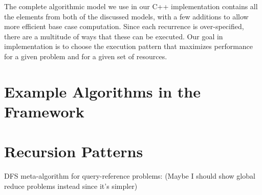 \documentclass[times, 10pt,twocolumn]{article}
\begin{document}
The complete algorithmic model we use in our C++ implementation contains all the elements from both of the discussed models, with a few additions to allow more efficient base case computation.
Since each recurrence is over-specified, there are a multitude of ways that these can be executed.
Our goal in implementation is to choose the execution pattern that maximizes performance for a given problem and for a given set of resources.

\section{Example Algorithms in the Framework}

\section{Recursion Patterns}

DFS meta-algorithm for query-reference problems:
(Maybe I should show global reduce problems instead since it's simpler)
\end{document}
